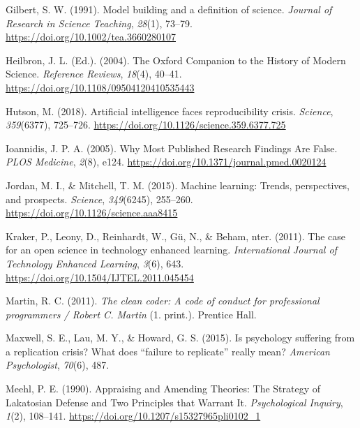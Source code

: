 \documentclass[12pt,a4paper,]{article}
\begin{document}
\leavevmode\hypertarget{ref-gilbertModelBuildingDefinition1991}{}%
Gilbert, S. W. (1991). Model building and a definition of science. \emph{Journal of Research in Science Teaching}, \emph{28}(1), 73--79. \url{https://doi.org/10.1002/tea.3660280107}

\leavevmode\hypertarget{ref-heilbronOxfordCompanionHistory2004}{}%
Heilbron, J. L. (Ed.). (2004). The Oxford Companion to the History of Modern Science. \emph{Reference Reviews}, \emph{18}(4), 40--41. \url{https://doi.org/10.1108/09504120410535443}

\leavevmode\hypertarget{ref-hutsonArtificialIntelligenceFaces2018}{}%
Hutson, M. (2018). Artificial intelligence faces reproducibility crisis. \emph{Science}, \emph{359}(6377), 725--726. \url{https://doi.org/10.1126/science.359.6377.725}

\leavevmode\hypertarget{ref-ioannidisWhyMostPublished2005}{}%
Ioannidis, J. P. A. (2005). Why Most Published Research Findings Are False. \emph{PLOS Medicine}, \emph{2}(8), e124. \url{https://doi.org/10.1371/journal.pmed.0020124}

\leavevmode\hypertarget{ref-jordanMachineLearningTrends2015}{}%
Jordan, M. I., \& Mitchell, T. M. (2015). Machine learning: Trends, perspectives, and prospects. \emph{Science}, \emph{349}(6245), 255--260. \url{https://doi.org/10.1126/science.aaa8415}

\leavevmode\hypertarget{ref-krakerCaseOpenScience2011}{}%
Kraker, P., Leony, D., Reinhardt, W., Gü, N., \& Beham, nter. (2011). The case for an open science in technology enhanced learning. \emph{International Journal of Technology Enhanced Learning}, \emph{3}(6), 643. \url{https://doi.org/10.1504/IJTEL.2011.045454}

\leavevmode\hypertarget{ref-martinCleanCoderCode2011}{}%
Martin, R. C. (2011). \emph{The clean coder: A code of conduct for professional programmers / Robert C. Martin} (1. print.). Prentice Hall.

\leavevmode\hypertarget{ref-maxwellPsychologySufferingReplication2015}{}%
Maxwell, S. E., Lau, M. Y., \& Howard, G. S. (2015). Is psychology suffering from a replication crisis? What does ``failure to replicate'' really mean? \emph{American Psychologist}, \emph{70}(6), 487.

\leavevmode\hypertarget{ref-meehlAppraisingAmendingTheories1990}{}%
Meehl, P. E. (1990). Appraising and Amending Theories: The Strategy of Lakatosian Defense and Two Principles that Warrant It. \emph{Psychological Inquiry}, \emph{1}(2), 108--141. \url{https://doi.org/10.1207/s15327965pli0102_1}
\end{document}

